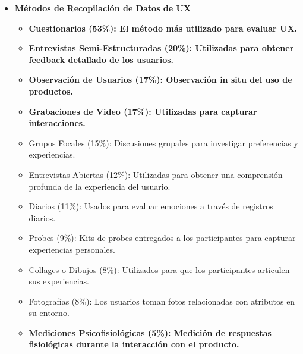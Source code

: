 \begin{itemize}
\begin{itemize}
    \item \textbf{Métodos de Recopilación de Datos de UX}
    \begin{itemize}
        \item \textbf{Cuestionarios (53\%): El método más utilizado para evaluar UX.}
        \item \textbf{Entrevistas Semi-Estructuradas (20\%): Utilizadas para obtener feedback detallado de los usuarios.}
        \item  \textbf{Observación de Usuarios (17\%): Observación in situ del uso de productos.}
        \item \textbf{Grabaciones de Video (17\%): Utilizadas para capturar interacciones.}
        \item Grupos Focales (15\%): Discusiones grupales para investigar preferencias y experiencias.
        \item  Entrevistas Abiertas (12\%): Utilizadas para obtener una comprensión profunda de la experiencia del usuario.
        \item Diarios (11\%): Usados para evaluar emociones a través de registros diarios.
        \item Probes (9\%): Kits de probes entregados a los participantes para capturar experiencias personales.
        \item  Collages o Dibujos (8\%): Utilizados para que los participantes articulen sus experiencias.
        \item Fotografías (8\%): Los usuarios toman fotos relacionadas con atributos en su entorno.
        \item \textbf{Mediciones Psicofisiológicas (5\%): Medición de respuestas fisiológicas durante la interacción con el producto.}
    \end{itemize}  
\end{itemize}
    
\end{itemize}
